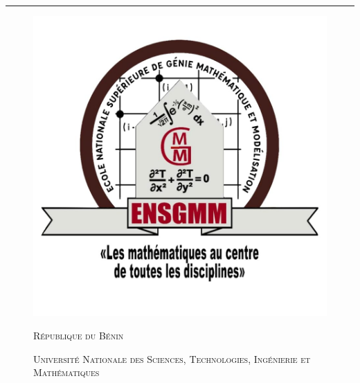 \begin{titlepage}
	\begin{center}
		
		\hrule height 0.1cm %
		\begin{figure}[!htb]
			\begin{minipage}{0.22\textwidth}
				\includegraphics[width=\linewidth]{Figures/ensgmm}
			\end{minipage}
			\hfill
			\begin{minipage}{0.50\textwidth}
				\begin{center}
					{\scshape\Large République du Bénin\par}
					\vspace{0.3cm}
					{\scshape\large Université Nationale des Sciences, Technologies, Ingénierie et Mathématiques\par}
					\vspace{0.3cm}
				\end{center}
				

\end{minipage}
\end{figure}
\end{center}
\end{titlepage}
